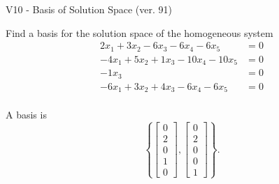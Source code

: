 \begin{exercise}
  \begin{exerciseTitle}V10 - Basis of Solution Space (ver. 91)\end{exerciseTitle}
  \begin{exerciseStatement}
    Find a basis for the solution space of the homogeneous system 
\begin{align*}
 2 x_ 1 + 3 x_ 2 -6 x_ 3 -6 x_ 4 -6 x_ 5 &= 0  \\ 
  -4 x_ 1 + 5 x_ 2 + 1 x_ 3 -10 x_ 4 -10 x_ 5 &= 0  \\ 
  -1 x_ 3 &= 0  \\ 
  -6 x_ 1 + 3 x_ 2 + 4 x_ 3 -6 x_ 4 -6 x_ 5 &= 0  \\ 
 \end{align*}


 
  \end{exerciseStatement}

  \begin{exerciseAnswer}
   A basis is   
\[\left\{\left[\begin{array}{c}
0 \\
2 \\
0 \\
1 \\
0
\end{array}\right] , \left[\begin{array}{c}
0 \\
2 \\
0 \\
0 \\
1
\end{array}\right]\right\}.\]

  


  \end{exerciseAnswer}
\end{exercise}